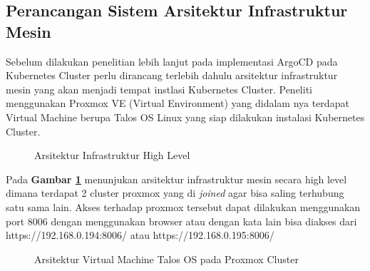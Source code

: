 \subsection{Perancangan Sistem Arsitektur Infrastruktur Mesin}
Sebelum dilakukan penelitian lebih lanjut pada implementasi ArgoCD pada
Kubernetes Cluster perlu dirancang terlebih dahulu arsitektur infrastruktur
mesin yang akan menjadi tempat instlasi Kubernetes Cluster. Peneliti
menggunakan Proxmox VE (Virtual Environment) yang didalam nya terdapat Virtual
Machine berupa Talos OS Linux yang siap dilakukan instalasi Kubernetes Cluster.
\begin{figure}[H]
  \centering
  \caption{Arsitektur Infrastruktur High Level}
  \label{fig:arsitektur_infrastruktur_mesin}
\end{figure}
Pada \textbf{Gambar \ref{fig:arsitektur_infrastruktur_mesin}} menunjukan
arsitektur infrastruktur mesin secara high level dimana terdapat 2 cluster
proxmox yang di \textit{joined} agar bisa saling terhubung satu sama lain.
Akses terhadap proxmox tersebut dapat dilakukan menggunakan port 8006 dengan
menggunakan browser atau dengan kata lain bisa diakses dari
https://192.168.0.194:8006/ atau https://192.168.0.195:8006/
\begin{figure}[H]
  \centering
  \caption{Arsitektur Virtual Machine Talos OS pada Proxmox Cluster}
  \label{fig:arsitektur_virtual_machine_talos_os}
\end{figure}


